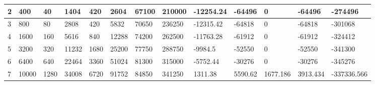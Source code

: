 \begin{table}[]
{\begin{tabular}{|l|l|l|l|l|l|l|l|l|l|l|l|l|}
    2     & 400       & 40            & 1404                                                  & 420                                                            & 2604                                                     & 67100                                                      & 210000                                                          & -12254.24 & -64496     & 0             & -64496           & -274496         \\ \hline
    3     & 800       & 80            & 2808                                                  & 420                                                            & 5832                                                     & 70650                                                      & 236250                                                          & -12315.42 & -64818     & 0             & -64818           & -301068         \\ \hline
    4     & 1600      & 160           & 5616                                                  & 840                                                            & 12288                                                    & 74200                                                      & 262500                                                          & -11763.28 & -61912     & 0             & -61912           & -324412         \\ \hline
    5     & 3200      & 320           & 11232                                                 & 1680                                                           & 25200                                                    & 77750                                                      & 288750                                                          & -9984.5   & -52550     & 0             & -52550           & -341300         \\ \hline
    6     & 6400      & 640           & 22464                                                 & 3360                                                           & 51024                                                    & 81300                                                      & 315000                                                          & -5752.44  & -30276     & 0             & -30276           & -345276         \\ \hline
    7     & 10000     & 1280          & 34008                                                 & 6720                                                           & 91752                                                    & 84850                                                      & 341250                                                          & 1311.38   & 5590.62    & 1677.186      & 3913.434         & -337336.566     \\ \hline

\end{tabular}}
\end{table}
